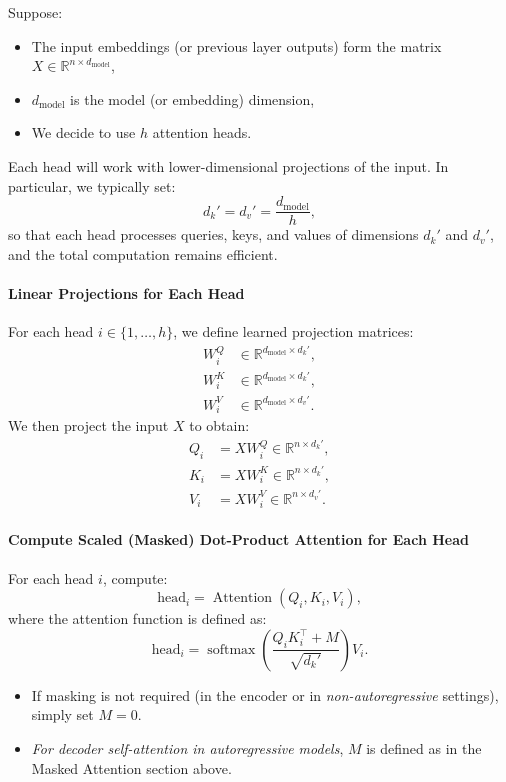 Suppose:
\begin{itemize}
	\item The input embeddings (or previous layer outputs) form the matrix \(X \in \mathbb{R}^{n \times d_{\text{model}}}\),
	\item \(d_{\text{model}}\) is the model (or embedding) dimension,
	\item We decide to use \(h\) attention heads.
\end{itemize}

Each head will work with lower-dimensional projections of the input. In particular, we typically set:
\[
d_k' = d_v' = \frac{d_{\text{model}}}{h},
\]
so that each head processes queries, keys, and values of dimensions \(d_k'\) and \(d_v'\), and the total computation remains efficient.

\paragraph{Linear Projections for Each Head}

   For each head \(i \in \{1, \dots, h\}\), we define learned projection matrices:
   \[
   \begin{aligned}
   W_i^Q &\in \mathbb{R}^{d_{\text{model}} \times d_k'}, \\
   W_i^K &\in \mathbb{R}^{d_{\text{model}} \times d_k'}, \\
   W_i^V &\in \mathbb{R}^{d_{\text{model}} \times d_v'}.
   \end{aligned}
   \]
   We then project the input \(X\) to obtain:
   \[
   \begin{aligned}
   Q_i &= X W_i^Q \in \mathbb{R}^{n \times d_k'}, \\
   K_i &= X W_i^K \in \mathbb{R}^{n \times d_k'}, \\
   V_i &= X W_i^V \in \mathbb{R}^{n \times d_v'}.
   \end{aligned}
   \]

\paragraph{Compute Scaled (Masked) Dot-Product Attention for Each Head}

   For each head \(i\), compute:
   \[
   \text{head}_i = \operatorname{Attention}(Q_i, K_i, V_i),
   \]
   where the attention function is defined as:
   \[
   \text{head}_i = \operatorname{softmax}\!\left(\frac{Q_iK_i^\top + M}{\sqrt{d_k'}}\right) V_i.
   \]
   \begin{itemize}
	   \item If masking is not required (\eg in the encoder or in \textit{non-autoregressive} settings), simply set \(M = 0\).
	   \item \textit{For decoder self-attention in autoregressive models}, \(M\) is defined as in the Masked Attention section above.
   \end{itemize}

